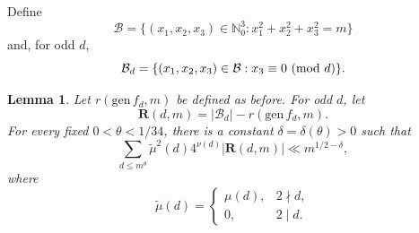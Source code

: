 \documentclass[12pt,a4paper,reqno]{amsart}
\numberwithin{equation}{section}
\def\pmod #1{\ ({\rm{mod}}\ #1)}
\theoremstyle{plain}
\newtheorem{lemma}{Lemma}
\theoremstyle{definition}
\begin{document}
Define
\[
\mathcal B=\{(x_1,x_2,x_3)\in\mathbb N_0^3:x_1^2+x_2^2+x_3^2=m\}
\]
and, for odd $d$,
\[
\mathcal B_d=\{(x_1,x_2,x_3)\in\mathcal B:x_3\equiv0\pmod d\}.
\]


\begin{lemma}\label{lem1}
Let $r(\mathrm{gen}\,f_d,m)$ be defined as before. For odd $d$, let
\[
\mathbf R(d,m)=|\mathcal B_d|-r(\mathrm{gen}\,f_d,m).
\]
For every fixed $0<\theta<1/34$, there is a constant $\delta=\delta(\theta)>0$ such that
\[
\sum_{d\leq m^\theta}\widetilde\mu^2(d)4^{\nu(d)}|\mathbf R(d,m)|
\ll m^{1/2-\delta},
\]
where
\[
\widetilde\mu(d)=
\begin{cases}
\mu(d),&2\nmid d,\\
0,&2\mid d.
\end{cases}
\]
\end{lemma}
\end{document}
